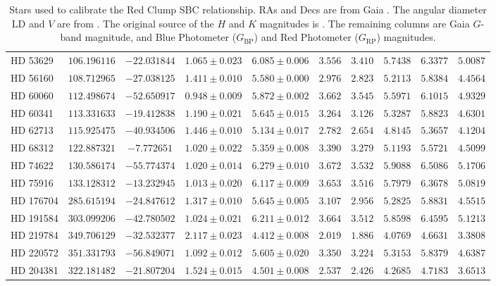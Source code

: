 \documentclass[linenumbers,trackchanges,margins]{aastex701}
\begin{document}
\begin{table}[htbp]
\begin{tabular}{lccccccccc}
HD 53629 & $106.196116$ & $-22.031844$ & $1.065 \pm 0.023$ & $6.085 \pm 0.006$ & $3.556$ & $3.410$ & $5.7438$ & $6.3377$ & $5.0087$ \\
HD 56160 & $108.712965$ & $-27.038125$ & $1.411 \pm 0.010$ & $5.580 \pm 0.000$ & $2.976$ & $2.823$ & $5.2113$ & $5.8384$ & $4.4564$ \\
HD 60060 & $112.498674$ & $-52.650917$ & $0.948 \pm 0.009$ & $5.872 \pm 0.002$ & $3.662$ & $3.545$ & $5.5971$ & $6.1015$ & $4.9329$ \\
HD 60341 & $113.331633$ & $-19.412838$ & $1.190 \pm 0.021$ & $5.645 \pm 0.015$ & $3.264$ & $3.126$ & $5.3287$ & $5.8823$ & $4.6301$ \\
HD 62713 & $115.925475$ & $-40.934506$ & $1.446 \pm 0.010$ & $5.134 \pm 0.017$ & $2.782$ & $2.654$ & $4.8145$ & $5.3657$ & $4.1204$ \\
HD 68312 & $122.887321$ & $-7.772651$ & $1.020 \pm 0.022$ & $5.359 \pm 0.008$ & $3.390$ & $3.279$ & $5.1193$ & $5.5721$ & $4.5099$ \\
HD 74622 & $130.586174$ & $-55.774374$ & $1.020 \pm 0.014$ & $6.279 \pm 0.010$ & $3.672$ & $3.532$ & $5.9088$ & $6.5086$ & $5.1706$ \\
HD 75916 & $133.128312$ & $-13.232945$ & $1.013 \pm 0.020$ & $6.117 \pm 0.009$ & $3.653$ & $3.516$ & $5.7979$ & $6.3678$ & $5.0819$ \\
HD 176704 & $285.615194$ & $-24.847612$ & $1.317 \pm 0.010$ & $5.645 \pm 0.005$ & $3.107$ & $2.956$ & $5.2825$ & $5.8831$ & $4.5515$ \\
HD 191584 & $303.099206$ & $-42.780502$ & $1.024 \pm 0.021$ & $6.211 \pm 0.012$ & $3.664$ & $3.512$ & $5.8598$ & $6.4595$ & $5.1213$ \\
HD 219784 & $349.706129$ & $-32.532377$ & $2.117 \pm 0.023$ & $4.412 \pm 0.008$ & $2.019$ & $1.886$ & $4.0769$ & $4.6631$ & $3.3808$ \\
HD 220572 & $351.331793$ & $-56.849071$ & $1.092 \pm 0.012$ & $5.605 \pm 0.020$ & $3.350$ & $3.224$ & $5.3153$ & $5.8379$ & $4.6387$ \\
HD 204381 & $322.181482$ & $-21.807204$ & $1.524 \pm 0.015$ & $4.501 \pm 0.008$ & $2.537$ & $2.426$ & $4.2685$ & $4.7183$ & $3.6513$ \\
\hline
\hline
\end{tabular}
\caption{Stars used to calibrate the Red Clump SBC relationship.  RAs and Decs are from Gaia \citep{2023A&A...674A...1G}.
The angular diameter LD and $V$ are
from \citet{2019Natur.567..200P}.  
The original source of the $H$ and $K$ magnitudes is \citet{2012MNRAS.419.1637L}.
The remaining columns are Gaia $G$-band magnitude, and Blue Photometer ($G_{\text{BP}}$) and 
    Red Photometer ($G_{\text{RP}}$)
    magnitudes.
\label{tab:extended_data_2}}

\end{table}
\end{document}
